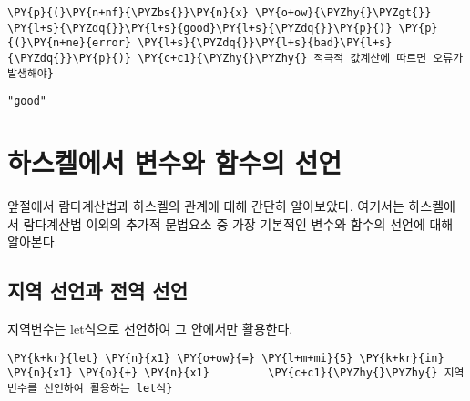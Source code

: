     \begin{tcolorbox}[breakable, size=fbox, boxrule=1pt, pad at break*=1mm,colback=cellbackground, colframe=cellborder, top=.75ex]
\begin{Verbatim}[commandchars=\\\{\}]
\PY{p}{(}\PY{n+nf}{\PYZbs{}}\PY{n}{x} \PY{o+ow}{\PYZhy{}\PYZgt{}} \PY{l+s}{\PYZdq{}}\PY{l+s}{good}\PY{l+s}{\PYZdq{}}\PY{p}{)} \PY{p}{(}\PY{n+ne}{error} \PY{l+s}{\PYZdq{}}\PY{l+s}{bad}\PY{l+s}{\PYZdq{}}\PY{p}{)} \PY{c+c1}{\PYZhy{}\PYZhy{} 적극적 값계산에 따르면 오류가 발생해야}
\end{Verbatim}
\end{tcolorbox}

    
    \begin{Verbatim}[commandchars=\\\{\}]
"good"
    \end{Verbatim}

    
    \hypertarget{uxd558uxc2a4uxcf08uxc5d0uxc11c-uxbcc0uxc218uxc640-uxd568uxc218uxc758-uxc120uxc5b8}{%
\section{하스켈에서 변수와 함수의
선언}\label{uxd558uxc2a4uxcf08uxc5d0uxc11c-uxbcc0uxc218uxc640-uxd568uxc218uxc758-uxc120uxc5b8}}

앞절에서 람다계산법과 하스켈의 관계에 대해 간단히 알아보았다. 여기서는
하스켈에서 람다계산법 이외의 추가적 문법요소 중 가장 기본적인 변수와
함수의 선언에 대해 알아본다.

    \hypertarget{uxc9c0uxc5ed-uxc120uxc5b8uxacfc-uxc804uxc5ed-uxc120uxc5b8}{%
\subsection{지역 선언과 전역
선언}\label{uxc9c0uxc5ed-uxc120uxc5b8uxacfc-uxc804uxc5ed-uxc120uxc5b8}}

지역변수는 let식으로 선언하여 그 안에서만 활용한다.

    \begin{tcolorbox}[breakable, size=fbox, boxrule=1pt, pad at break*=1mm,colback=cellbackground, colframe=cellborder, top=.75ex]
\begin{Verbatim}[commandchars=\\\{\}]
\PY{k+kr}{let} \PY{n}{x1} \PY{o+ow}{=} \PY{l+m+mi}{5} \PY{k+kr}{in} \PY{n}{x1} \PY{o}{+} \PY{n}{x1}         \PY{c+c1}{\PYZhy{}\PYZhy{} 지역번수를 선언하여 활용하는 let식}
\end{Verbatim}
\end{tcolorbox}

